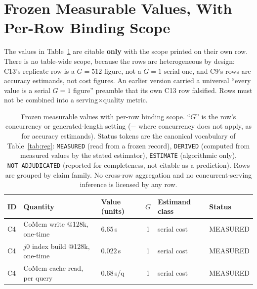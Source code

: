 \documentclass{article}
\begin{document}
\section{Frozen Measurable Values, With Per-Row Binding Scope}\label{sec:frozen}
The values in Table~\ref{tab:frozen} are citable \textbf{only} with the scope printed on their
own row. There is no table-wide scope, because the rows are heterogeneous by design: C13's
replicate row is a $G{=}512$ figure, not a $G{=}1$ serial one, and C9's rows are accuracy
estimands, not cost figures. An earlier version carried a universal ``every value is a serial
$G{=}1$ figure'' preamble that its own C13 row falsified. Rows must not be combined into a
serving$\times$quality metric.

\begin{table}[t]
\centering
\caption{Frozen measurable values with per-row binding scope. ``$G$'' is the row's concurrency
or generated-length setting ($-$ where concurrency does not apply, as for accuracy estimands).
Status tokens are the canonical vocabulary of Table~\ref{tab:reg}: \texttt{MEASURED} (read from a
frozen record), \texttt{DERIVED} (computed from measured values by the stated estimator),
\texttt{ESTIMATE} (algorithmic only), \texttt{NOT\_ADJUDICATED} (reported for completeness, not
citable as a prediction). Rows are grouped by claim family. No cross-row aggregation and no
concurrent-serving inference is licensed by any row.}
\label{tab:frozen}
\footnotesize
\setlength{\tabcolsep}{1.5pt}
\begin{tabular}{@{}>{\raggedright\arraybackslash}p{0.7cm}>{\raggedright\arraybackslash}p{3.7cm}>{\raggedright\arraybackslash}p{3.3cm}c>{\raggedright\arraybackslash}p{2.15cm}>{\raggedright\arraybackslash}p{3.05cm}@{}}
\toprule
\textbf{ID} & \textbf{Quantity} & \textbf{Value (units)} & \textbf{$G$} &
\textbf{Estimand class} & \textbf{Status} \\
\midrule
C4 & CoMem write @128k, one-time & $6.65$\,s & 1 & serial cost & MEASURED \\
C4 & $j0$ index build @128k, one-time & $0.022$\,s & 1 & serial cost & MEASURED \\
C4 & CoMem cache read, per query & $0.68$\,s/q & 1 & serial cost & MEASURED \\

\end{tabular}
\end{table}
\end{document}
